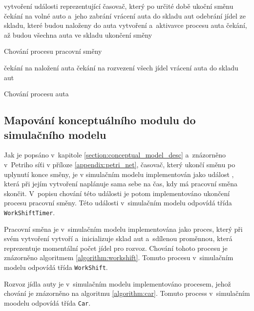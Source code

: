 \documentclass[a4paper, 11pt]{article}
\begin{document}
	\begin{algorithm}[ht]

		vytvoření události reprezentující časovač, který po určité době
		ukoční směnu\;
		{
			čekání na volné auto a~jeho zabrání\;
			{
				vrácení auta do skladu aut\;
				\Break\;
			}
			{
				odebrání jídel ze skladu, které budou naloženy do auta\;
				vytvoření a~aktivavce procesu auta\;
			}
		}
		čekání, až budou všechna auta ve skladu\;
		ukončení směny\;

		\caption{Chování procesu pracovní směny}
		\label{algorithm:workshift}
	\end{algorithm}

	\begin{algorithm}[ht]
		čekání na naložení auta\;
		čekání na rozvezení všech jídel\;
		vrácení auta do skladu aut\;

		\caption{Chování procesu auta}
		\label{algorithm:car}
	\end{algorithm}


	\subsection{Mapování konceptuálního modulu do simulačního modelu}

	Jak je popsáno v~kapitole \ref{section:conceptual_model_desc}
	a~znázorněno v~Petriho síťi v příloze \ref{appendix:petri_net}, časovač,
	který ukončí směnu po uplynutí konce směny, je v simulačním modelu
	implementován jako událost \cite[snímek 169]{IMS_slides}, která
	při jejím vytvoření naplánuje sama sebe na čas, kdy má pracovní směna
	skončit. V~popisu chování této události je potom implementováno
	ukončení procesu pracovní směny. Této události v~simulačním modelu
	odpovídá třída \texttt{WorkShiftTimer}.

	Pracovní směna je v~simulačním modelu implementována jako proces, který
	při svém vytvoření vytvoří a~inicializuje sklad
	\cite[snímek 184]{IMS_slides} aut a~sdílenou proměnnou, která reprezentuje
	momentální počet jídel pro rozvoz. Chování tohoto procesu
	je znázorněno algoritmem \ref{algorithm:workshift}. Tomuto procesu
	v~simulačním modelu odpovídá třída \texttt{WorkShift}.

	Rozvoz jídla auty je v~simulačním modelu implementováno procesem, jehož
	chování je znázorněno na algoritmu \ref{algorithm:car}. Tomuto process
	v~simulačním moodelu odpovídá třída \texttt{Car}.
\end{document}
